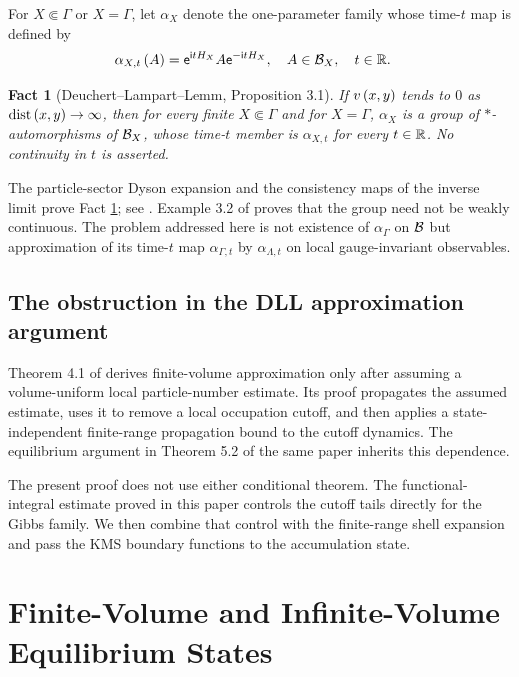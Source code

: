 \documentclass[11pt,a4paper]{article}
\theoremstyle{plain}
\newtheorem{fact}[thm]{Fact}
\theoremstyle{definition}
\theoremstyle{remark}
\begin{document}
For \(X \Subset \Gamma\) or \(X = \Gamma\), let \(\alpha_X\) denote the one-parameter family whose time-\(t\) map is defined by \[\begin{aligned}
\fun{\alpha_{X,t}}{A}
& =
\napiernum^{\imunit tH_X}A\napiernum^{-\imunit tH_X},
\quad
A \in \oa{B}_X,
\quad
t \in \fldreal.
\end{aligned}\]

\begin{fact}[Deuchert--Lampart--Lemm, Proposition 3.1]\label{fact:dll-buchholz-automorphism}
If $v \left( x,y \right)$ tends to $0$ as $\operatorname{dist} \left( x,y \right) \to \infty$, then
for every finite $X\Subset\Gamma$ and for $X=\Gamma$, $\alpha_X$ is a group of $\ast$-automorphisms of
$\mathcal{B}_X$, whose time-$t$ member is $\alpha_{X,t}$ for every $t \in \mathbb{R}$.
No continuity in $t$ is asserted.
\end{fact}

The particle-sector Dyson expansion and the consistency maps of the inverse limit prove Fact \ref{fact:dll-buchholz-automorphism}; see \cite[Proposition 3.1 and equations (21)--(29)]{DeuchertLampartLemm001}. Example 3.2 of \cite{DeuchertLampartLemm001} proves that the group need not be weakly continuous. The problem addressed here is not existence of \(\alpha_{\Gamma}\) on \(\mathcal{B}\) but approximation of its time-\(t\) map \(\alpha_{\Gamma,t}\) by \(\alpha_{\Lambda,t}\) on local gauge-invariant observables.

\subsection{The obstruction in the DLL approximation argument}\label{the-obstruction-in-the-dll-approximation-argument}

Theorem 4.1 of \cite{DeuchertLampartLemm001} derives finite-volume approximation only after assuming a volume-uniform local particle-number estimate. Its proof propagates the assumed estimate, uses it to remove a local occupation cutoff, and then applies a state-independent finite-range propagation bound to the cutoff dynamics. The equilibrium argument in Theorem 5.2 of the same paper inherits this dependence.

The present proof does not use either conditional theorem. The functional-integral estimate proved in this paper controls the cutoff tails directly for the Gibbs family. We then combine that control with the finite-range shell expansion and pass the KMS boundary functions to the accumulation state.

\section{Finite-Volume and Infinite-Volume Equilibrium States}\label{finite-volume-and-infinite-volume-equilibrium-states}
\end{document}
